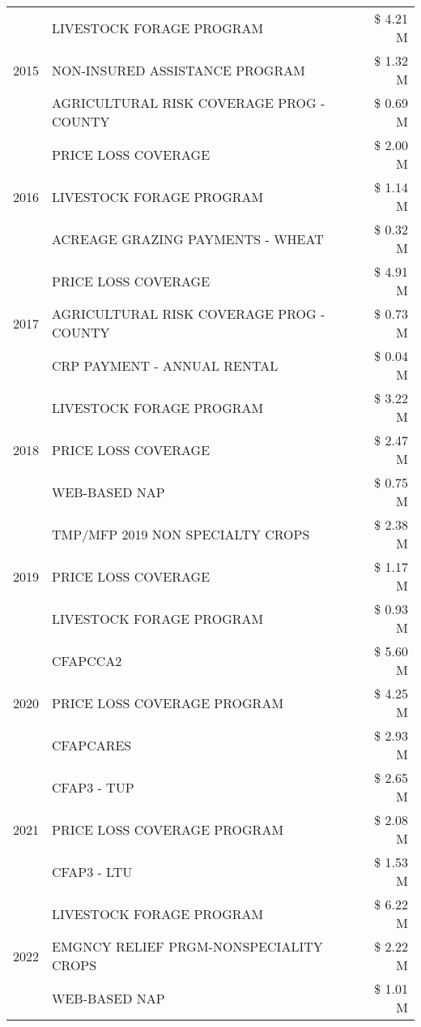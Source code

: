 \begin{tabular}{llr}
\cline{1-3}
\multirow[t]{3}{*}{2015} & LIVESTOCK FORAGE PROGRAM & \$ 4.21 M \\
 & NON-INSURED ASSISTANCE PROGRAM & \$ 1.32 M \\
 & AGRICULTURAL RISK COVERAGE PROG - COUNTY & \$ 0.69 M \\
\cline{1-3}
\multirow[t]{3}{*}{2016} & PRICE LOSS COVERAGE & \$ 2.00 M \\
 & LIVESTOCK FORAGE PROGRAM & \$ 1.14 M \\
 & ACREAGE GRAZING PAYMENTS - WHEAT & \$ 0.32 M \\
\cline{1-3}
\multirow[t]{3}{*}{2017} & PRICE LOSS COVERAGE & \$ 4.91 M \\
 & AGRICULTURAL RISK COVERAGE PROG - COUNTY & \$ 0.73 M \\
 & CRP PAYMENT - ANNUAL RENTAL & \$ 0.04 M \\
\cline{1-3}
\multirow[t]{3}{*}{2018} & LIVESTOCK FORAGE PROGRAM & \$ 3.22 M \\
 & PRICE LOSS COVERAGE & \$ 2.47 M \\
 & WEB-BASED NAP & \$ 0.75 M \\
\cline{1-3}
\multirow[t]{3}{*}{2019} & TMP/MFP 2019 NON SPECIALTY CROPS & \$ 2.38 M \\
 & PRICE LOSS COVERAGE & \$ 1.17 M \\
 & LIVESTOCK FORAGE PROGRAM & \$ 0.93 M \\
\cline{1-3}
\multirow[t]{3}{*}{2020} & CFAPCCA2 & \$ 5.60 M \\
 & PRICE LOSS COVERAGE PROGRAM & \$ 4.25 M \\
 & CFAPCARES & \$ 2.93 M \\
\cline{1-3}
\multirow[t]{3}{*}{2021} & CFAP3 - TUP & \$ 2.65 M \\
 & PRICE LOSS COVERAGE PROGRAM & \$ 2.08 M \\
 & CFAP3 - LTU & \$ 1.53 M \\
\cline{1-3}
\multirow[t]{3}{*}{2022} & LIVESTOCK FORAGE PROGRAM & \$ 6.22 M \\
 & EMGNCY RELIEF PRGM-NONSPECIALITY CROPS & \$ 2.22 M \\
 & WEB-BASED NAP & \$ 1.01 M \\
\cline{1-3}
\bottomrule
\end{tabular}
